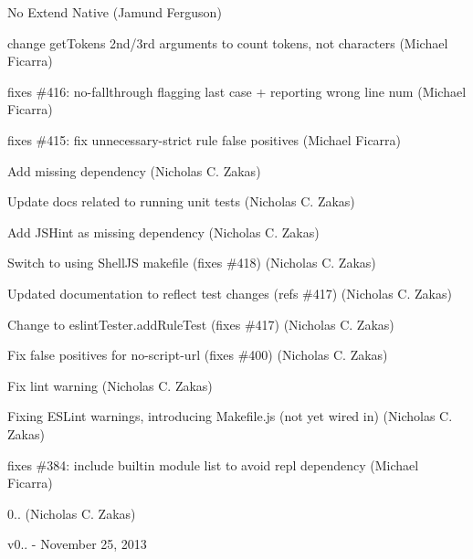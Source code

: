 \begin{DoxyItemize}
\item No Extend Native (Jamund Ferguson)
\item change get\+Tokens 2nd/3rd arguments to count tokens, not characters (Michael Ficarra)
\item fixes \#416\+: no-\/fallthrough flagging last case + reporting wrong line num (Michael Ficarra)
\item fixes \#415\+: fix unnecessary-\/strict rule false positives (Michael Ficarra)
\item Add missing dependency (Nicholas C. Zakas)
\item Update docs related to running unit tests (Nicholas C. Zakas)
\item Add J\+S\+Hint as missing dependency (Nicholas C. Zakas)
\item Switch to using Shell\+JS makefile (fixes \#418) (Nicholas C. Zakas)
\item Updated documentation to reflect test changes (refs \#417) (Nicholas C. Zakas)
\item Change to eslint\+Tester.\+add\+Rule\+Test (fixes \#417) (Nicholas C. Zakas)
\item Fix false positives for no-\/script-\/url (fixes \#400) (Nicholas C. Zakas)
\item Fix lint warning (Nicholas C. Zakas)
\item Fixing E\+S\+Lint warnings, introducing Makefile.\+js (not yet wired in) (Nicholas C. Zakas)
\item fixes \#384\+: include builtin module list to avoid repl dependency (Michael Ficarra)
\item 0.. (Nicholas C. Zakas)
\end{DoxyItemize}

v0.. -\/ November 25, 2013


